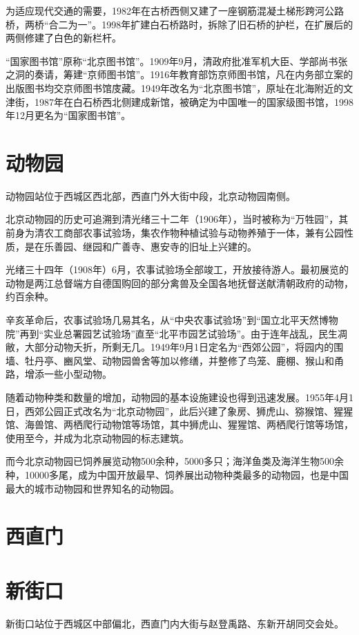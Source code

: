 为适应现代交通的需要，1982年在古桥西侧又建了一座钢筋混凝土梯形跨河公路桥，两桥“合二为一”。1998年扩建白石桥路时，拆除了旧石桥的护栏，在扩展后的两侧修建了白色的新栏杆。

“国家图书馆”原称“北京图书馆”。1909年9月，清政府批准军机大臣、学部尚书张之洞的奏请，筹建“京师图书馆”。1916年教育部饬京师图书馆，凡在内务部立案的出版图书均交京师图书馆庋藏。1949年改名为“北京图书馆”，原址在北海附近的文津街，1987年在白石桥西北侧建成新馆，被确定为中国唯一的国家级图书馆，1998年12月更名为“国家图书馆”。

\section{动物园}
动物园站位于西城区西北部，西直门外大街中段，北京动物园南侧。

北京动物园的历史可追溯到清光绪三十二年（1906年），当时被称为“万牲园”，其前身为清农工商部农事试验场，集农作物种植试验与动物养殖于一体，兼有公园性质，是在乐善园、继园和广善寺、惠安寺的旧址上兴建的。

光绪三十四年（1908年）6月，农事试验场全部竣工，开放接待游人。最初展览的动物是两江总督端方自德国购回的部分禽兽及全国各地抚督送献清朝政府的动物，约百余种。

辛亥革命后，农事试验场几易其名，从“中央农事试验场”到“国立北平天然博物院”再到“实业总署园艺试验场”直至“北平市园艺试验场”。由于连年战乱，民生凋敝，大部分动物夭折，所剩无几。1949年9月1日定名为“西郊公园”，将园内的围墙、牡丹亭、豳风堂、动物园兽舍等加以修缮，并整修了鸟笼、鹿棚、猴山和甬路，增添一些小型动物。

随着动物种类和数量的增加，动物园的基本设施建设也得到迅速发展。1955年4月1日，西郊公园正式改名为“北京动物园”，此后兴建了象房、狮虎山、猕猴馆、猩猩馆、海兽馆、两栖爬行动物馆等场馆，其中狮虎山、猩猩馆、两栖爬行馆等场馆，使用至今，并成为北京动物园的标志建筑。

而今北京动物园已饲养展览动物500余种，5000多只；海洋鱼类及海洋生物500余种，10000多尾，成为中国开放最早、饲养展出动物种类最多的动物园，也是中国最大的城市动物园和世界知名的动物园。

\section{西直门}

\section{新街口}
新街口站位于西城区中部偏北，西直门内大街与赵登禹路、东新开胡同交会处。

